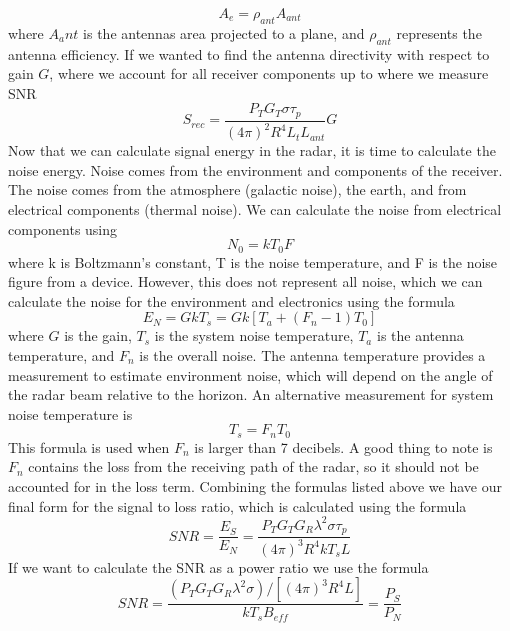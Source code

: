 \documentclass[12pt]{article}
\begin{document}
\begin{equation}
    A_{e} = \rho_{ant} A_{ant}
\end{equation}
where $A_ant$ is the antennas area projected to a plane, and $\rho_{ant}$ represents the antenna efficiency. If we wanted to find the antenna directivity with respect to gain $G$, where we account for all receiver components up to where we measure SNR
\begin{equation}
    S_{rec} = \frac{P_T G_T \sigma \tau_p}{(4 \pi)^2 R^4 L_t L_{ant}} G
\end{equation}
Now that we can calculate signal energy in the radar, it is time to calculate the noise energy. Noise comes from the environment and components of the receiver. The noise comes from the atmosphere (galactic noise), the earth, and from electrical components (thermal noise). We can calculate the noise from electrical components using
\begin{equation}
    N_0 = kT_0F
\end{equation}
where k is Boltzmann's constant, T is the noise temperature, and F is the noise figure from a device. However, this does not represent all noise, which we can calculate the noise for the environment and electronics using the formula
\begin{equation}
    E_N =   GkT_s= Gk \left[ T_a + (F_n - 1) T_0\right]
\end{equation}
where $G$ is the gain, $T_s$ is the system noise temperature, $T_a$ is the antenna temperature, and $F_n$ is the overall noise. The antenna temperature provides a measurement to estimate environment noise, which will depend on the angle of the radar beam relative to the horizon. An alternative measurement for system noise temperature is 
\begin{equation}
    T_s = F_n T_0
\end{equation}
This formula is used when $F_n$ is larger than 7 decibels. A good thing to note is $F_n$ contains the loss from the receiving path of the radar, so it should not be accounted for in the loss term. Combining the formulas listed above we have our final form for the signal to loss ratio, which is calculated using the formula
\begin{equation}
    SNR = \frac{E_S}{E_N} = \frac{P_T G_T G_R \lambda^2 \sigma \tau_p}{ (4 \pi)^3 R^4 k T_s L }
\end{equation}
If we want to calculate the SNR as a power ratio we use the formula 
\begin{equation}
    SNR = \frac{ (P_T G_T G_R \lambda^2 \sigma) / \left[ (4 \pi)^3 R^4 L \right] }{k T_s B_{eff}} = \frac{P_S}{P_N}
\end{equation}
\end{document}
